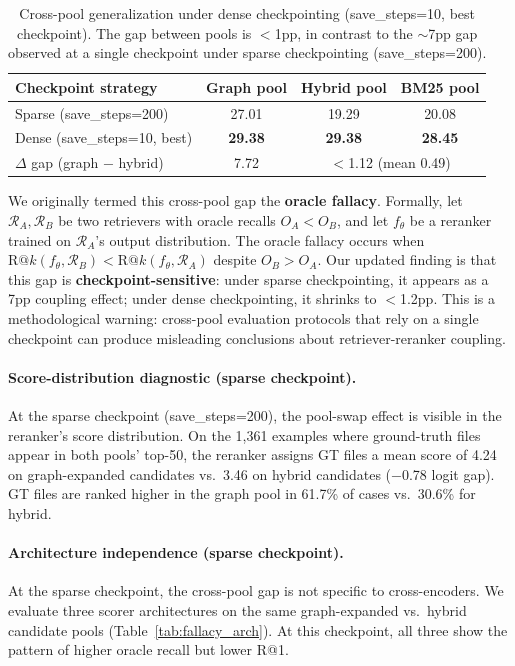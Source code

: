 \documentclass{article}
\begin{document}
\begin{table}[h]
\centering
\caption{Cross-pool generalization under dense checkpointing (save\_steps=10, best checkpoint). The gap between pools is $<$1pp, in contrast to the $\sim$7pp gap observed at a single checkpoint under sparse checkpointing (save\_steps=200).}
\label{tab:recovery}
\small
\begin{tabular}{lccc}
\toprule
\textbf{Checkpoint strategy} & \textbf{Graph pool} & \textbf{Hybrid pool} & \textbf{BM25 pool} \\
\midrule
Sparse (save\_steps=200) & 27.01 & 19.29 & 20.08 \\
Dense (save\_steps=10, best) & \textbf{29.38} & \textbf{29.38} & \textbf{28.45} \\
\midrule
$\Delta$ gap (graph $-$ hybrid) & 7.72 & \multicolumn{2}{c}{$<$1.12 (mean 0.49)} \\
\bottomrule
\end{tabular}
\end{table}

We originally termed this cross-pool gap the \textbf{oracle fallacy}.
Formally, let $\mathcal{R}_A, \mathcal{R}_B$ be two retrievers with oracle recalls $O_A < O_B$, and let $f_\theta$ be a reranker trained on $\mathcal{R}_A$'s output distribution.
The oracle fallacy occurs when $\text{R@}k(f_\theta, \mathcal{R}_B) < \text{R@}k(f_\theta, \mathcal{R}_A)$ despite $O_B > O_A$.
Our updated finding is that this gap is \textbf{checkpoint-sensitive}: under sparse checkpointing, it appears as a 7pp coupling effect; under dense checkpointing, it shrinks to $<$1.2pp.
This is a methodological warning: cross-pool evaluation protocols that rely on a single checkpoint can produce misleading conclusions about retriever-reranker coupling.

\paragraph{Score-distribution diagnostic (sparse checkpoint).}
At the sparse checkpoint (save\_steps=200), the pool-swap effect is visible in the reranker's score distribution.
On the 1,361 examples where ground-truth files appear in both pools' top-50, the reranker assigns GT files a mean score of 4.24 on graph-expanded candidates vs.\ 3.46 on hybrid candidates ($-$0.78 logit gap).
GT files are ranked higher in the graph pool in 61.7\% of cases vs.\ 30.6\% for hybrid.

\paragraph{Architecture independence (sparse checkpoint).}
At the sparse checkpoint, the cross-pool gap is not specific to cross-encoders.
We evaluate three scorer architectures on the same graph-expanded vs.\ hybrid candidate pools (Table~\ref{tab:fallacy_arch}).
At this checkpoint, all three show the pattern of higher oracle recall but lower R@1.
\end{document}
